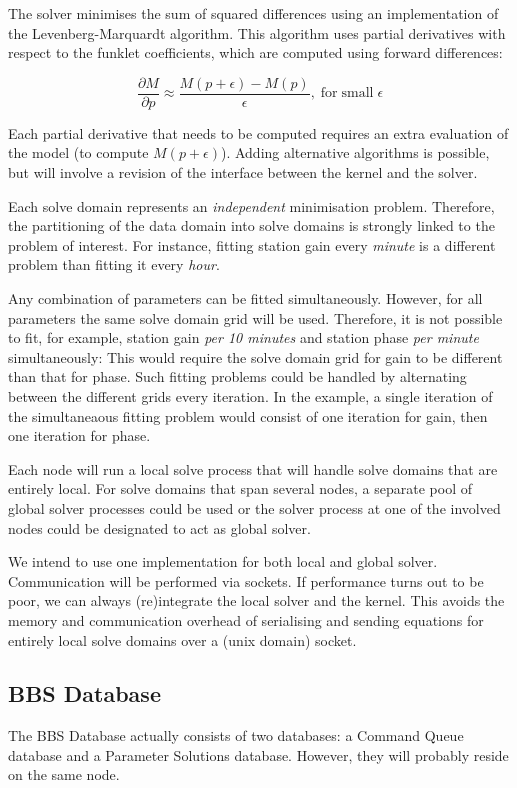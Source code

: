 \documentclass[10pt]{lofar}
\begin{document}
The solver minimises the sum of squared differences using an implementation of
the Levenberg-Marquardt algorithm. This algorithm uses partial derivatives with
respect to the funklet coefficients, which are computed using forward
differences:

\[
\frac{\partial M}{\partial p} \approx \frac{M(p + \epsilon) -
M(p)}{\epsilon}\mathrm{,}\;\mathrm{for}\;\mathrm{small}\;\epsilon
\]

Each partial derivative that needs to be computed requires an extra evaluation
of the model (to compute $M(p + \epsilon)$). Adding alternative algorithms is
possible, but will involve a revision of the interface between the kernel and
the solver.

Each solve domain represents an \emph{independent} minimisation problem.
Therefore, the partitioning of the data domain into solve domains is strongly
linked to the problem of interest. For instance, fitting station gain every
\emph{minute} is a different problem than fitting it every \emph{hour}.

Any combination of parameters can be fitted simultaneously. However, for all
parameters the same solve domain grid will be used. Therefore, it is not
possible to fit, for example, station gain \emph{per 10 minutes} and station
phase \emph{per minute} simultaneously: This would require the solve domain grid
for gain to be different than that for phase. Such fitting problems could be
handled by alternating between the different grids every iteration. In the
example, a single iteration of the simultaneaous fitting problem would consist
of one iteration for gain, then one iteration for phase.

Each node will run a local solve process that will handle solve domains that are
entirely local. For solve domains that span several nodes, a separate pool of
global solver processes could be used or the solver process at one of the
involved nodes could be designated to act as global solver.

We intend to use one implementation for both local and global solver.
Communication will be performed via sockets. If performance turns out to be
poor, we can always (re)integrate the local solver and the kernel. This avoids
the memory and communication overhead of serialising and sending equations for
entirely local solve domains over a (unix domain) socket.

\subsection{BBS Database}
\label{subsec:design-database}
The BBS Database actually consists of two databases: a Command Queue database
and a Parameter Solutions database. However, they will probably reside on the
same node.
\end{document}
